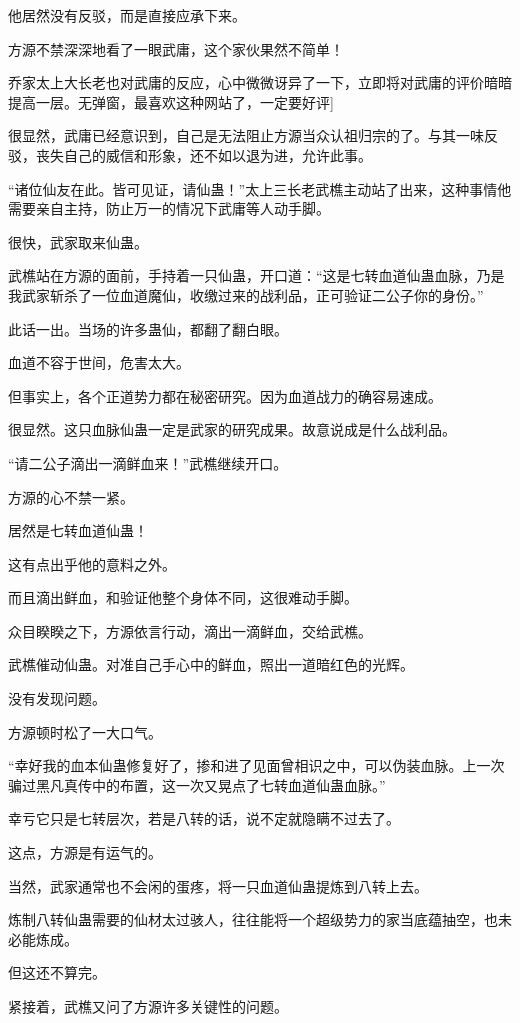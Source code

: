 \begin{this_body}
他居然没有反驳，而是直接应承下来。

方源不禁深深地看了一眼武庸，这个家伙果然不简单！

乔家太上大长老也对武庸的反应，心中微微讶异了一下，立即将对武庸的评价暗暗提高一层。无弹窗，最喜欢这种网站了，一定要好评]

很显然，武庸已经意识到，自己是无法阻止方源当众认祖归宗的了。与其一味反驳，丧失自己的威信和形象，还不如以退为进，允许此事。

“诸位仙友在此。皆可见证，请仙蛊！”太上三长老武樵主动站了出来，这种事情他需要亲自主持，防止万一的情况下武庸等人动手脚。

很快，武家取来仙蛊。

武樵站在方源的面前，手持着一只仙蛊，开口道：“这是七转血道仙蛊血脉，乃是我武家斩杀了一位血道魔仙，收缴过来的战利品，正可验证二公子你的身份。”

此话一出。当场的许多蛊仙，都翻了翻白眼。

血道不容于世间，危害太大。

但事实上，各个正道势力都在秘密研究。因为血道战力的确容易速成。

很显然。这只血脉仙蛊一定是武家的研究成果。故意说成是什么战利品。

“请二公子滴出一滴鲜血来！”武樵继续开口。

方源的心不禁一紧。

居然是七转血道仙蛊！

这有点出乎他的意料之外。

而且滴出鲜血，和验证他整个身体不同，这很难动手脚。

众目睽睽之下，方源依言行动，滴出一滴鲜血，交给武樵。

武樵催动仙蛊。对准自己手心中的鲜血，照出一道暗红色的光辉。

没有发现问题。

方源顿时松了一大口气。

“幸好我的血本仙蛊修复好了，掺和进了见面曾相识之中，可以伪装血脉。上一次骗过黑凡真传中的布置，这一次又晃点了七转血道仙蛊血脉。”

幸亏它只是七转层次，若是八转的话，说不定就隐瞒不过去了。

这点，方源是有运气的。

当然，武家通常也不会闲的蛋疼，将一只血道仙蛊提炼到八转上去。

炼制八转仙蛊需要的仙材太过骇人，往往能将一个超级势力的家当底蕴抽空，也未必能炼成。

但这还不算完。

紧接着，武樵又问了方源许多关键性的问题。


\end{this_body}
